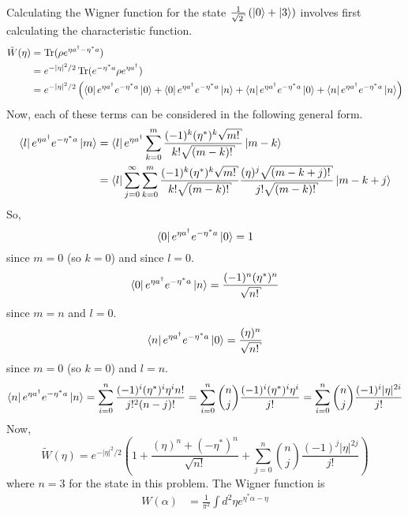 \begin{homeworkProblem}
    Calculating the Wigner function for the state $ \frac{1}{\sqrt{2}} \left(
    \ket{0} + \ket{3} \right) $ involves first calculating the characteristic
    function.
    \begin{align}
        \tilde{W}(\eta) &= \operatorname{Tr}(\rho e^{\eta a^\dagger - \eta^* a}) \\
                        &= e^{- \left| \eta \right|^2/2} \operatorname{Tr}(e^{-\eta^* a} \rho
        e^{\eta a^\dagger}) \\
        &= e^{-\left| \eta \right|^2/2} \left( \bra{0} e^{\eta a^\dagger} e^{-
    \eta^* a} \ket{0} + \bra{0} e^{\eta a^\dagger} e^{- \eta^* a} \ket{n} +
    \bra{n} e^{\eta a^\dagger} e^{- \eta^* a} \ket{0} +
    \bra{n} e^{\eta a^\dagger} e^{- \eta^* a} \ket{n}
\right)
    \end{align}
    Now, each of these terms can be considered in the following general form.
    \begin{align}
        \bra{l} e^{\eta a^\dagger}e^{-\eta^*a} \ket{m} &=
        \bra{l} e^{\eta a^\dagger} \sum_{k=0}^m \frac{(-1)^k
        (\eta^*)^k \sqrt{m!}}{k!\sqrt{(m-k)!}} \ket{m-k} \\
        &= \bra{l}
        \sum_{j=0}^\infty \sum_{k=0}^m \frac{(-1)^k (\eta^*)^k \sqrt{m!}}{k!
            \sqrt{(m-k)!}} \frac{(\eta)^j \sqrt{(m-k+j)!}}{j! \sqrt{(m-k)!}}
            \ket{m-k+j}
    \end{align}
    So,
    \[
        \bra{0}e^{\eta a^\dagger}e^{-\eta^* a} \ket{0} = 1
    \]
    since $ m=0 $ (so $ k=0 $) and since $ l=0 $.
    \[
        \bra{0}e^{\eta a^\dagger}e^{-\eta^* a} \ket{n} =  \frac{(-1)^n
        (\eta^*)^n}{\sqrt{n!}}
    \]
    since $ m=n $ and $ l=0 $.
    \[
        \bra{n}e^{\eta a^\dagger}e^{-\eta^* a} \ket{0} =  \frac{
        (\eta)^n}{\sqrt{n!}}
    \]
    since $ m=0 $ (so $ k=0 $) and $ l=n $.
    \[
        \bra{n}e^{\eta a^\dagger}e^{-\eta^* a} \ket{n} =
        \sum_{i=0}^{n} \frac{(-1)^i (\eta^*)^i \eta^i n!}{j!^2 (n-j)!}
        = \sum_{i=0}^{n} \binom{n}{j} \frac{(-1)^i (\eta^*)^i \eta^i}{j!}
        = \sum_{i=0}^{n} \binom{n}{j} \frac{(-1)^i |\eta|^{2i}}{j!}
    \]
    Now,
    \[
        \tilde{W}(\eta) = e^{- \left| \eta \right|^2/2} \left( 1 +
            \frac{(\eta)^n + (-\eta^*)^n}{\sqrt{n!}} + \sum_{j=0}^n \binom{n}{j} \frac{(-1)^j
    \left| \eta \right|^{2j}}{j!} \right)
    \]
    where $ n=3 $ for the state in this problem. The Wigner function is
    \begin{align}
        W(\alpha) &= \frac{1}{\pi^2} \int d^2\eta e^{\eta^* \alpha - \eta
}
\end{align}
\end{homeworkProblem}
